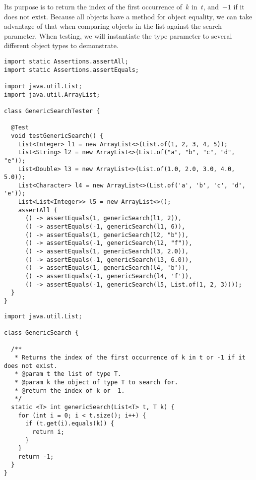 Its purpose is to return the index of the first occurrence of~$k$ in~$t$, and~$-1$ if it does not exist. 
Because all objects have a  method for object equality, we can take advantage of that when comparing objects in the list against the search parameter. 
When testing, we will instantiate the type parameter to several different object types to demonstrate.

\newpage %
\begin{lstlisting}[language=MyJava]
import static Assertions.assertAll;
import static Assertions.assertEquals;

import java.util.List;
import java.util.ArrayList;

class GenericSearchTester {

  @Test 
  void testGenericSearch() {
    List<Integer> l1 = new ArrayList<>(List.of(1, 2, 3, 4, 5));
    List<String> l2 = new ArrayList<>(List.of("a", "b", "c", "d", "e"));
    List<Double> l3 = new ArrayList<>(List.of(1.0, 2.0, 3.0, 4.0, 5.0));
    List<Character> l4 = new ArrayList<>(List.of('a', 'b', 'c', 'd', 'e'));
    List<List<Integer>> l5 = new ArrayList<>();
    assertAll (
      () -> assertEquals(1, genericSearch(l1, 2)),
      () -> assertEquals(-1, genericSearch(l1, 6)),
      () -> assertEquals(1, genericSearch(l2, "b")),
      () -> assertEquals(-1, genericSearch(l2, "f")),
      () -> assertEquals(1, genericSearch(l3, 2.0)),
      () -> assertEquals(-1, genericSearch(l3, 6.0)),
      () -> assertEquals(1, genericSearch(l4, 'b')),
      () -> assertEquals(-1, genericSearch(l4, 'f')),
      () -> assertEquals(-1, genericSearch(l5, List.of(1, 2, 3))));
  }
}
\end{lstlisting}

\begin{lstlisting}[language=MyJava]
import java.util.List;

class GenericSearch {

  /**
   * Returns the index of the first occurrence of k in t or -1 if it does not exist.
   * @param t the list of type T.
   * @param k the object of type T to search for.
   * @return the index of k or -1.
   */
  static <T> int genericSearch(List<T> t, T k) {
    for (int i = 0; i < t.size(); i++) {
      if (t.get(i).equals(k)) { 
        return i; 
      }
    }
    return -1;
  }
}
\end{lstlisting}

